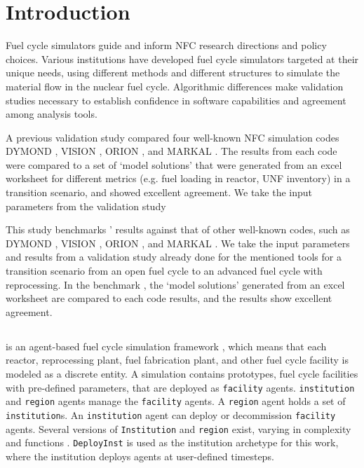 
\section{Introduction}
Fuel cycle simulators guide and inform \gls{NFC} research directions and policy choices.
Various institutions have developed fuel cycle simulators targeted at their unique needs,
using different methods and different structures
to simulate the material flow in the nuclear fuel cycle.
Algorithmic differences make
validation studies necessary to establish
confidence in software capabilities and
agreement among analysis tools.

A previous validation study \cite{feng_standardized_2016} compared
four well-known \gls{NFC} simulation codes
DYMOND \cite{yacout_modeling_2005},
VISION \cite{jacobson_verifiable_2010},
ORION \cite{gregg_analysis_2012}, and
MARKAL \cite{shay_epa_2006}. The results from each code
were compared to a set of `model solutions' that were generated
from an excel worksheet for different metrics (e.g. fuel loading in reactor,
\gls{UNF} inventory) in a transition scenario, and showed excellent agreement.
We take the input parameters from the validation study \cite{feng_stnadardized_2016}


This study benchmarks \Cyclus' results
against that of other well-known codes, such as
DYMOND \cite{yacout_modeling_2005},
VISION \cite{jacobson_verifiable_2010},
ORION \cite{gregg_analysis_2012}, and
MARKAL \cite{shay_epa_2006}. We take the input
parameters and results from a validation study
\cite{feng_standardized_2016} already done for the
mentioned tools for a transition scenario from an
open fuel cycle to an advanced fuel cycle with
reprocessing. In the benchmark \cite{feng_standardized_2016}, the `model solutions'
generated from an excel worksheet are compared
to each code results, and the results show
excellent agreement.


\subsection{\Cyclus}

\Cyclus is an agent-based fuel cycle simulation framework 
\cite{huff_fundamental_2016}, which means 
that each reactor, reprocessing plant, fuel fabrication plant, and other fuel cycle
facility is modeled as a discrete entity.
A \Cyclus simulation contains prototypes, fuel cycle facilities with
pre-defined parameters, that are deployed as \texttt{facility} agents.
\texttt{institution} and \texttt{region} agents manage the \texttt{facility} agents.
A \texttt{region} agent holds a set of \texttt{institution}s.
An \texttt{institution} agent can deploy or decommission \texttt{facility} agents.
Several versions of \texttt{Institution}
and \texttt{region} exist, varying in complexity and functions \cite{huff_extensions_2014}.
 \texttt{DeployInst} is used as the institution archetype for this work, where the institution
deploys agents at user-defined timesteps.
